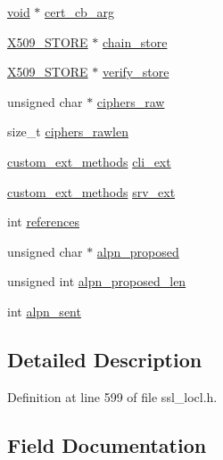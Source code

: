 \begin{DoxyCompactItemize}
\item 
\hyperlink{hw__4758__cca_8h_afad4d591c7931ff6dc5bf69c76c96aa0}{void} $\ast$ \hyperlink{structcert__st_aa3a74fb1bb790343f4396b215f1bd641}{cert\+\_\+cb\+\_\+arg}
\item 
\hyperlink{crypto_2ossl__typ_8h_a3a2b800bae08729d11bc28f12b795597}{X509\+\_\+\+S\+T\+O\+RE} $\ast$ \hyperlink{structcert__st_a964165744863e6e4afbb8a2193f025cc}{chain\+\_\+store}
\item 
\hyperlink{crypto_2ossl__typ_8h_a3a2b800bae08729d11bc28f12b795597}{X509\+\_\+\+S\+T\+O\+RE} $\ast$ \hyperlink{structcert__st_a96371eb1f5bdc1ff093c350a71a12ab0}{verify\+\_\+store}
\item 
unsigned char $\ast$ \hyperlink{structcert__st_afc56f82ac254030da9a4128d4f720720}{ciphers\+\_\+raw}
\item 
size\+\_\+t \hyperlink{structcert__st_a145b60f96f19d6df883fe3d01d739242}{ciphers\+\_\+rawlen}
\item 
\hyperlink{structcustom__ext__methods}{custom\+\_\+ext\+\_\+methods} \hyperlink{structcert__st_ad1726cd75514eb359222796c5b7b1812}{cli\+\_\+ext}
\item 
\hyperlink{structcustom__ext__methods}{custom\+\_\+ext\+\_\+methods} \hyperlink{structcert__st_aa5ec278e7638e9c550ee56a280adda6d}{srv\+\_\+ext}
\item 
int \hyperlink{structcert__st_a146fdb34d9a909e530adf8b189481195}{references}
\item 
unsigned char $\ast$ \hyperlink{structcert__st_aa873bf5399639150a667d3f9839b69f4}{alpn\+\_\+proposed}
\item 
unsigned int \hyperlink{structcert__st_a31aa97a4cd757c8a744e297971e3f3c8}{alpn\+\_\+proposed\+\_\+len}
\item 
int \hyperlink{structcert__st_a55424bb80f801e12e214fc3050be50c5}{alpn\+\_\+sent}
\end{DoxyCompactItemize}


\subsection{Detailed Description}


Definition at line 599 of file ssl\+\_\+locl.\+h.



\subsection{Field Documentation}
